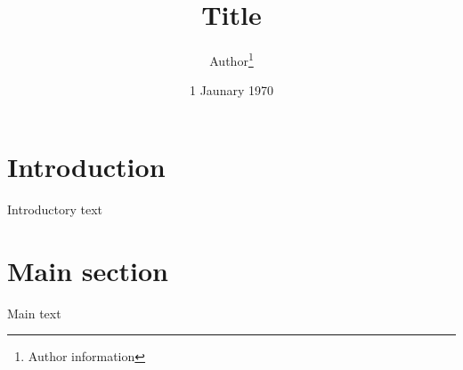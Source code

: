 \documentclass[11pt, a4paper, british]{article}
\begin{document}
	\title{Title}
	\author{Author\thanks{Author information}}
	\date{1 Jaunary 1970}

	\maketitle

	\section{Introduction}

		Introductory text

	\section{Main section}

		Main text
\end{document}
